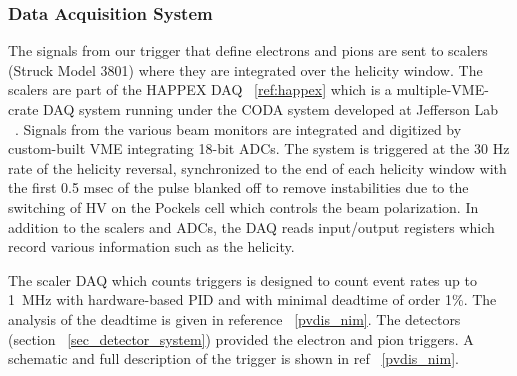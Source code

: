 \subsubsection{Data Acquisition System}
\label{sec:daq}

The signals from our trigger that define electrons and 
pions are sent to scalers (Struck Model 3801)
where they are integrated over the helicity window.  
The scalers are part of the HAPPEX DAQ ~\ref{ref:happex}
which is a multiple-VME-crate DAQ system running under the CODA system
developed at Jefferson Lab ~\cite{coda}.  
Signals from the various beam monitors 
are integrated and digitized by custom-built 
VME integrating 18-bit ADCs.  The system is
triggered at the 30 Hz rate of the helicity reversal,
synchronized to the end of each helicity window
with the first 0.5 msec of the pulse 
blanked off to remove instabilities due to the switching of
HV on the Pockels cell which controls the beam polarization.
In addition to the scalers and ADCs, the DAQ reads
input/output registers which record various information 
such as the helicity.

The scaler DAQ which counts triggers is designed
to count event rates up to 1~MHz with hardware-based PID
and with minimal deadtime of order 1\%.  
The analysis
of the deadtime is given in reference ~\ref{pvdis_nim}.
The detectors (section ~\ref{sec_detector_system})
provided the electron and pion triggers.  A schematic 
and full description of the
trigger is shown in ref ~\ref{pvdis_nim}.


